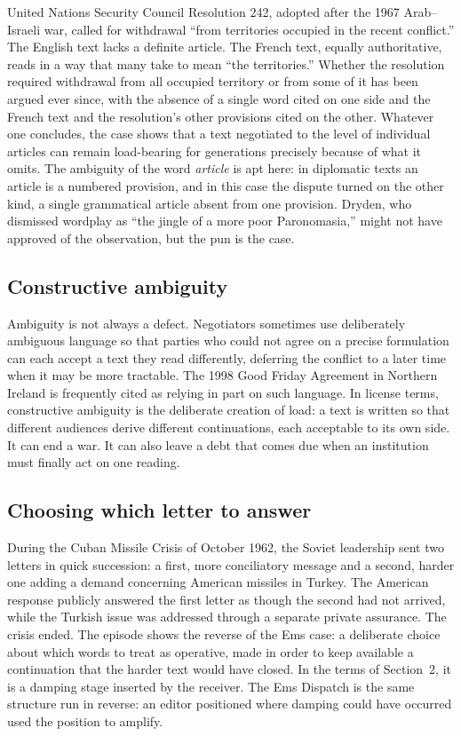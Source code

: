 \documentclass[11pt,a4paper]{article}
\theoremstyle{plain}
\theoremstyle{definition}
\theoremstyle{remark}
\begin{document}
United Nations Security Council Resolution 242, adopted after the 1967 Arab--Israeli war, called for withdrawal ``from territories occupied in the recent conflict.'' The English text lacks a definite article. The French text, equally authoritative, reads in a way that many take to mean ``the territories.'' Whether the resolution required withdrawal from all occupied territory or from some of it has been argued ever since, with the absence of a single word cited on one side and the French text and the resolution's other provisions cited on the other. Whatever one concludes, the case shows that a text negotiated to the level of individual articles can remain load-bearing for generations precisely because of what it omits. The ambiguity of the word \emph{article} is apt here: in diplomatic texts an article is a numbered provision, and in this case the dispute turned on the other kind, a single grammatical article absent from one provision. Dryden, who dismissed wordplay as ``the jingle of a more poor Paronomasia,'' might not have approved of the observation, but the pun is the case.

\subsection{Constructive ambiguity}

Ambiguity is not always a defect. Negotiators sometimes use deliberately ambiguous language so that parties who could not agree on a precise formulation can each accept a text they read differently, deferring the conflict to a later time when it may be more tractable. The 1998 Good Friday Agreement in Northern Ireland is frequently cited as relying in part on such language. In license terms, constructive ambiguity is the deliberate creation of load: a text is written so that different audiences derive different continuations, each acceptable to its own side. It can end a war. It can also leave a debt that comes due when an institution must finally act on one reading.

\subsection{Choosing which letter to answer}

During the Cuban Missile Crisis of October 1962, the Soviet leadership sent two letters in quick succession: a first, more conciliatory message and a second, harder one adding a demand concerning American missiles in Turkey. The American response publicly answered the first letter as though the second had not arrived, while the Turkish issue was addressed through a separate private assurance. The crisis ended. The episode shows the reverse of the Ems case: a deliberate choice about which words to treat as operative, made in order to keep available a continuation that the harder text would have closed. In the terms of Section~2, it is a damping stage inserted by the receiver. The Ems Dispatch is the same structure run in reverse: an editor positioned where damping could have occurred used the position to amplify.
\end{document}
